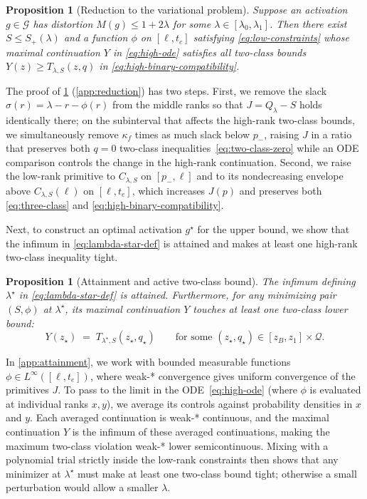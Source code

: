 \documentclass[11pt]{article}
\numberwithin{equation}{section}
\theoremstyle{plain}
\newtheorem{proposition}[theorem]{Proposition}
\theoremstyle{definition}
\newcommand{\1}{\mathbf{1}}
\newcommand{\calG}{\mathcal{G}}
\newcommand{\calQ}{\mathcal{Q}}
\begin{document}
\begin{proposition}[Reduction to the variational problem]
\label{prop:reduction}
Suppose an activation $g \in \calG$ has distortion $M(g) \le 1 + 2\lambda$ for some $\lambda \in [\lambda_0, \lambda_1]$. Then there exist $S \le S_+(\lambda)$ and a function $\phi$ on $[\ell, t_e]$ satisfying \cref{eq:low-constraints} whose maximal continuation $Y$ in \cref{eq:high-ode} satisfies all two-class bounds $Y(z) \ge T_{\lambda, S}(z, q)$ in \cref{eq:high-binary-compatibility}.
\end{proposition}

The proof of \cref{prop:reduction} (\cref{app:reduction}) has two steps. First, we remove the slack $\sigma(r) = \lambda - r - \phi(r)$ from the middle ranks so that $J = Q_\lambda - S$ holds identically there; on the subinterval that affects the high-rank two-class bounds, we simultaneously remove $\kappa_f$ times as much slack below $p_-$, raising $J$ in a ratio that preserves both $q = 0$ two-class inequalities~\eqref{eq:two-class-zero} while an ODE comparison controls the change in the high-rank continuation. Second, we raise the low-rank primitive to $C_{\lambda, S}$ on $[p_-, \ell]$ and to its nondecreasing envelope above $C_{\lambda, S}(\ell)$ on $[\ell, t_e]$, which increases $J(p)$ and preserves both \cref{eq:three-class} and \cref{eq:high-binary-compatibility}.

Next, to construct an optimal activation $g^\star$ for the upper bound, we show that the infimum in \cref{eq:lambda-star-def} is attained and makes at least one high-rank two-class inequality tight.

\begin{proposition}[Attainment and active two-class bound]
\label{prop:attainment}
The infimum defining $\lambda^\star$ in \cref{eq:lambda-star-def} is attained. Furthermore, for any minimizing pair $(S, \phi)$ at $\lambda^\star$, its maximal continuation $Y$ touches at least one two-class lower bound:
\[
  Y(z_\star) \;=\; T_{\lambda^\star, S}(z_\star, q_\star)
  \qquad \text{for some } (z_\star, q_\star) \in [z_B, z_1] \times \calQ.
\]
\end{proposition}

In \cref{app:attainment}, we work with bounded measurable functions $\phi \in L^\infty([\ell, t_e])$, where weak-* convergence gives uniform convergence of the primitives $J$. To pass to the limit in the ODE~\eqref{eq:high-ode} (where $\phi$ is evaluated at individual ranks $x, y$), we average its controls against probability densities in $x$ and $y$. Each averaged continuation is weak-* continuous, and the maximal continuation $Y$ is the infimum of these averaged continuations, making the maximum two-class violation weak-* lower semicontinuous. Mixing with a polynomial trial strictly inside the low-rank constraints then shows that any minimizer at $\lambda^\star$ must make at least one two-class bound tight; otherwise a small perturbation would allow a smaller $\lambda$.
\end{document}
